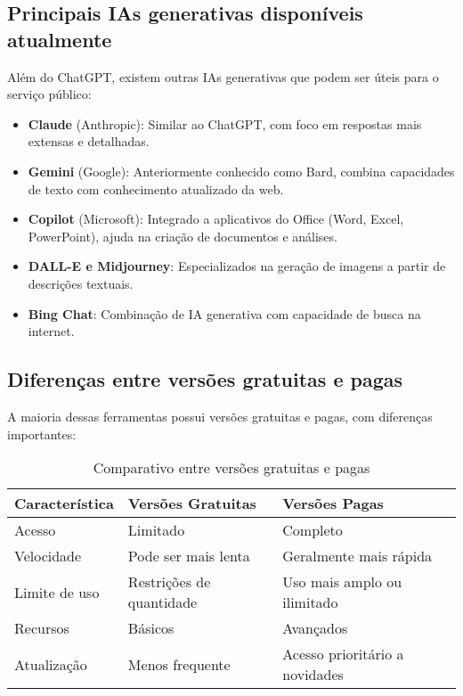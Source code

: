 \documentclass[12pt,a4paper]{book}
\begin{document}
\subsection{Principais IAs generativas disponíveis atualmente}

Além do ChatGPT, existem outras IAs generativas que podem ser úteis para o serviço público:

\begin{itemize}
    \item \textbf{Claude} (Anthropic): Similar ao ChatGPT, com foco em respostas mais extensas e detalhadas.
    \item \textbf{Gemini} (Google): Anteriormente conhecido como Bard, combina capacidades de texto com conhecimento atualizado da web.
    \item \textbf{Copilot} (Microsoft): Integrado a aplicativos do Office (Word, Excel, PowerPoint), ajuda na criação de documentos e análises.
    \item \textbf{DALL-E e Midjourney}: Especializados na geração de imagens a partir de descrições textuais.
    \item \textbf{Bing Chat}: Combinação de IA generativa com capacidade de busca na internet.
\end{itemize}

\subsection{Diferenças entre versões gratuitas e pagas}

A maioria dessas ferramentas possui versões gratuitas e pagas, com diferenças importantes:

\begin{table}[h]
\centering
\begin{tabular}{lll}
\toprule
\textbf{Característica} & \textbf{Versões Gratuitas} & \textbf{Versões Pagas} \\
\midrule
Acesso & Limitado & Completo \\
Velocidade & Pode ser mais lenta & Geralmente mais rápida \\
Limite de uso & Restrições de quantidade & Uso mais amplo ou ilimitado \\
Recursos & Básicos & Avançados \\
Atualização & Menos frequente & Acesso prioritário a novidades \\
\bottomrule
\end{tabular}
\caption{Comparativo entre versões gratuitas e pagas}
\end{table}
\end{document}
